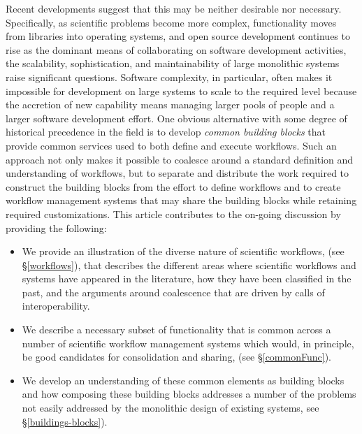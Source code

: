 Recent developments suggest that this may be neither desirable nor necessary.
Specifically, as scientific problems become more complex, functionality moves
from libraries into operating systems, and open source development continues to
rise as the dominant means of collaborating on software development activities,
the scalability, sophistication, and maintainability of large monolithic systems
raise significant questions. Software complexity, in particular, often makes it
impossible for development on large systems to scale to the required level 
because the accretion of new capability means managing larger pools of
people and a larger software development effort. One obvious alternative with
some degree of historical precedence in the field is to develop \textit{common
building blocks} that provide common services used to both define and execute
workflows. Such an approach not only makes it possible to coalesce around a
standard definition and understanding of workflows, but to separate and
distribute the work required to construct the building blocks from the effort to
define workflows and to create workflow management systems that may share the
building blocks while retaining required customizations. This article
contributes to the on-going discussion by providing the following:
\begin{itemize} \item We provide an illustration of the diverse nature of
scientific workflows, (see \S \ref{workflows}), that describes the different
areas where scientific workflows and systems have appeared in the literature,
how they have been classified in the past, and the arguments around coalescence
that are driven by calls of interoperability.  \item We describe a necessary
subset of functionality that is common across a number of scientific workflow
management systems which would, in principle, be good candidates for
consolidation and sharing, (see \S \ref{commonFunc}). \item We develop an understanding of
these common elements as building blocks and how composing these building blocks
addresses a number of the problems not easily addressed by the monolithic design
of existing systems, see \S \ref{buildings-blocks}). \end{itemize}

